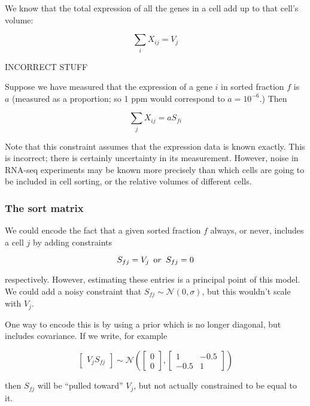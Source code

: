 \documentclass{article}
\begin{document}
We know that the total expression of all the genes in
a cell add up to that cell's volume:

\[
\sum_i X_{ij} = V_j
\]

\color{red}

INCORRECT STUFF

Suppose we have measured that the expression of a gene $i$ in sorted
fraction $f$ is $a$ (measured as a proportion; so 1 ppm would correspond
to $a = 10^{-6}$.) Then

\[
\sum_j X_{ij} = a S_{fi}
\]

Note that this constraint assumes that the expression data
is known exactly. This is incorrect; there is certainly
uncertainty in its measurement. However, noise in RNA-seq experiments
may be known more precisely than which cells are going to be
included in cell sorting, or the relative volumes of
different cells.

\color{black}

\subsubsection{The sort matrix}

We could encode the fact that a given sorted fraction $f$ always,
or never,
includes a cell $j$ by adding constraints

\[
S_{fj} = V_j \hspace{5pt} {\textrm or} \hspace{5pt} S_{fj} = 0
\]

respectively. However, estimating these entries is a principal point
of this model. We could add a noisy constraint that
$S_{fj} \sim \mathcal{N}(0, \sigma)$, but this wouldn't scale with $V_j$.


One way to encode this is by using a prior which is no longer diagonal,
but includes covariance. If we write, for example

\[
\begin{bmatrix}
V_j
S_{fj}
\end{bmatrix}
\sim \mathcal{N}(
\begin{bmatrix}
0 \\
0
\end{bmatrix}
,
\begin{bmatrix}
1 & -0.5 \\
-0.5 & 1 
\end{bmatrix}
)
\]

then $S_{fj}$ will be ``pulled toward'' $V_j$, but not actually
constrained to be equal to it.
\end{document}
